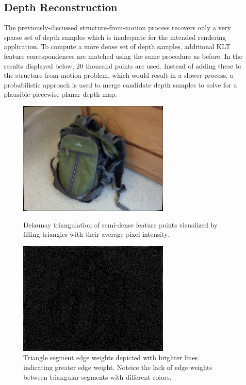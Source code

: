 \documentclass[conference]{acmsiggraph}
\begin{document}
\subsection{Depth Reconstruction}


The previously-discussed structure-from-motion process recovers
only a very sparse set of depth samples which is inadequate
for the intended rendering application.
To compute a more dense set of depth samples, additional KLT feature
correspondences are matched using the same procedure as before.
In the results displayed below, 20 thousand points are used.
Instead of adding these to the structure-from-motion problem,
which would result in a slower process, a probabilistic
approach is used to merge candidate depth samples
to solve for a plausible piecewise-planar depth map.

\begin{figure}[ht]
  \centering
  \includegraphics[width=3in]{images/delaunay}
  \caption{Delaunay triangulation of semi-dense feature points visualized
      by filling triangles with their average pixel intensity.}
  \label{fig:delaunay}
  \includegraphics[width=3in]{images/delaunay_edges}
  \caption{Triangle segment edge weights depicted with brighter lines
  indicating greater edge weight.  Noteice the lack of edge weights
  between triangular segments with different colors.}
  \label{fig:delaunay_edges}
\end{figure}
\end{document}
